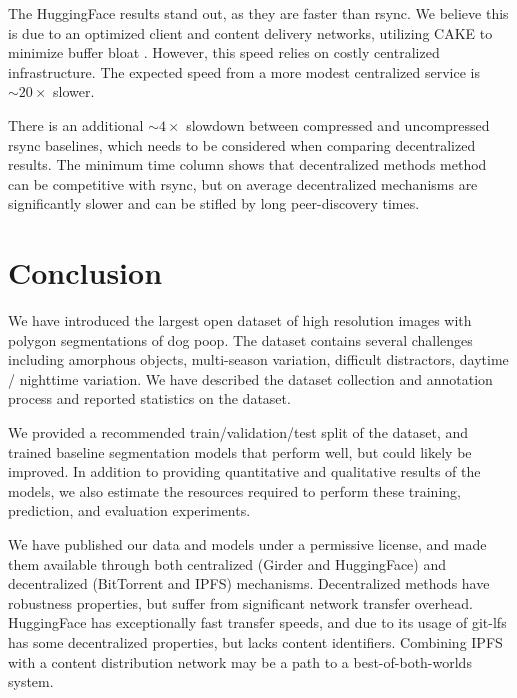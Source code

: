 \documentclass{article}
\begin{document}


The HuggingFace results stand out, as they are faster than rsync.
We believe this is due to an optimized client and content delivery networks, utilizing CAKE
  \cite{hoiland2018piece} to minimize buffer bloat \cite{gettys2012bufferbloat}.
However, this speed relies on costly centralized infrastructure.
The expected speed from a more modest centralized service is $\sim\!20\times$ slower.

There is an additional $\sim\!4\times$  slowdown between compressed and uncompressed rsync baselines, which needs to be
  considered when comparing decentralized results.
The minimum time column shows that decentralized methods method can be competitive with rsync, but on
  average decentralized mechanisms are significantly slower and can be stifled by long peer-discovery times.
  
\section{Conclusion}

We have introduced the largest open dataset of high resolution images with polygon
  segmentations of dog poop.
The dataset contains several challenges including amorphous objects, multi-season variation, difficult
  distractors, daytime / nighttime variation.
We have described the dataset collection and annotation process and reported statistics on the dataset.

We provided a recommended train/validation/test split of the dataset, and trained baseline segmentation
  models that perform well, but could likely be improved.
In addition to providing quantitative and qualitative results of the models, we also estimate the resources
  required to perform these training, prediction, and evaluation experiments.

We have published our data and models under a permissive license, and made them available through both
  centralized (Girder and HuggingFace) and decentralized (BitTorrent and IPFS) mechanisms.
Decentralized methods have robustness properties, but suffer from significant network transfer overhead.
HuggingFace has exceptionally fast transfer speeds, and due to its usage of git-lfs has some decentralized
  properties, but lacks content identifiers.
Combining IPFS with a content distribution network may be a path to a best-of-both-worlds system.
\end{document}
